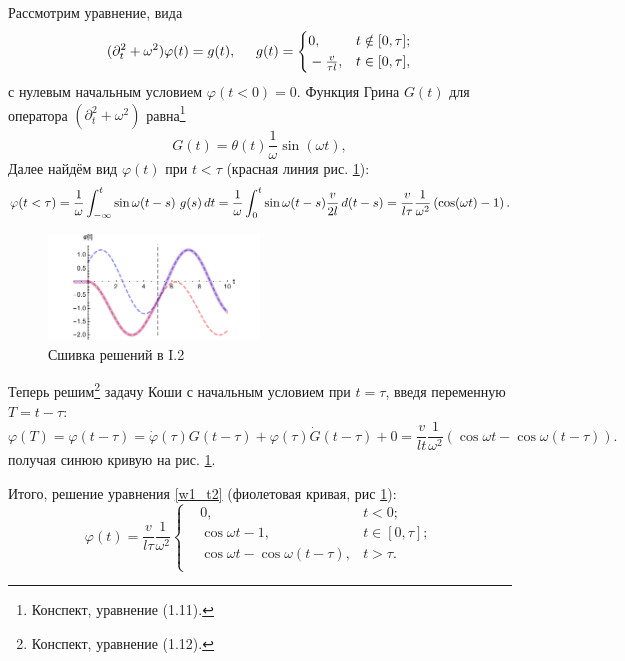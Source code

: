 Рассмотрим уравнение, вида
\begin{equation*}
    (\partial_t^2 + \omega^2) \varphi(t) = g(t),
    \hspace{5 mm}   
    g(t) = \left\{\begin{aligned}
        &0, &t\notin [0, \tau]; \\
        &- \tfrac{v}{\tau l}, &t \in [0, \tau], \\
    \end{aligned}\right.
    \label{w1_t2}
\end{equation*}
с нулевым начальным условием $\varphi(t<0)=0$.
Функция Грина $G(t)$ для оператора $(\partial_t^2 + \omega^2)$ равна\footnote{
    Конспект, уравнение (1.11).
} 
\begin{equation}
    G(t) = \theta(t) \frac{1}{\omega} \sin(\omega t),
    \label{w1osc}
\end{equation}
Далее найдём вид $\varphi(t)$ при $t < \tau$ (красная линия рис. \ref{fig:I2}):
\begin{equation*}
    \varphi(t < \tau) = \frac{1}{\omega} \int_{-\infty}^{t} \sin \omega(t-s) \ g(s) \, d t = \frac{1}{\omega} \int_0^t \sin \omega(t-s) \frac{v}{2l} \, d (t-s) = 
    \frac{v}{l \tau} \frac{1}{\omega^2} \left(
        \cos(\omega t) - 1
    \right).
\end{equation*}

\begin{figure}[ht]
    \centering
    \includegraphics[width=0.5\textwidth]{figures/T2.pdf}
    \caption{Сшивка решений в I.2}
    \label{fig:I2}
\end{figure}

Теперь решим\footnote{
    Конспект, уравнение (1.12).
}  задачу Коши с начальным условием при $t = \tau$, введя переменную $T = t-\tau$:
\begin{equation*}
    \varphi(T) = \varphi(t-\tau) = \dot{\varphi}(\tau) G(t-\tau) + \varphi(\tau) \dot{G}(t-\tau) + 0 = 
    \frac{v}{lt} \frac{1}{\omega^2} \left(
        \cos \omega t - \cos \omega(t-\tau)
    \right).
\end{equation*}
 получая синюю кривую на рис. \ref{fig:I2}.

 Итого, решение уравнения \eqref{w1_t2} (фиолетовая кривая, рис \ref{fig:I2}):
 \begin{equation*}
     \varphi(t) = \frac{v}{l \tau} \frac{1}{\omega^2}\left\{\begin{aligned}
        &0
        , &t < 0; \\
        & \cos \omega t - 1
        , &t \in [0, \tau]; \\
        & \cos \omega t - \cos \omega(t-\tau)
        , &t > \tau. \\
     \end{aligned}\right.
 \end{equation*}


